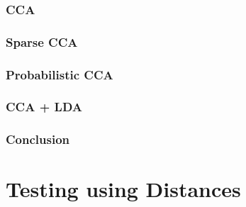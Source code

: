 \documentclass{beamer}
\begin{document}
\begin{frame}
  \frametitle{CCA}
\end{frame}

\begin{frame}
  \frametitle{Sparse CCA}
\end{frame}

\begin{frame}
  \frametitle{Probabilistic CCA}
\end{frame}

\begin{frame}
  \frametitle{CCA + LDA}
\end{frame}

\begin{frame}
  \frametitle{Conclusion}
  
\end{frame}



\section{Testing using Distances}
\label{sec:testing_distances}
\end{document}
